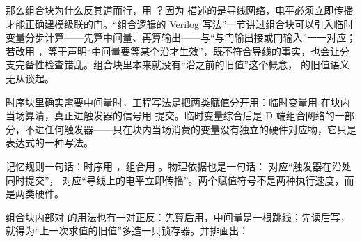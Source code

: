 那么组合块为什么反其道而行，用 \code{=}？因为  描述的是导线网络，电平必须立即传播才能正确建模级联的门。“组合逻辑的 Verilog 写法”一节讲过组合块可以引入临时变量分步计算——先算中间量、再算输出——与“与门输出接或门输入”一一对应；若改用 \code{<=}，等于声明“中间量要等某个沿才生效”，既不符合导线的事实，也会让分支完备性检查错乱。组合块里本来就没有“沿之前的旧值”这个概念，\code{<=} 的旧值语义无从谈起。

时序块里确实需要中间量时，工程写法是把两类赋值分开用：临时变量用 \code{=} 在块内当场算清，真正进触发器的信号用 \code{<=} 提交。临时变量综合后是 D 端组合网络的一部分，不进任何触发器——只在块内当场消费的变量没有独立的硬件对应物，它只是表达式的一种写法。

记忆规则一句话：时序用 \code{<=}，组合用 \code{=}。物理依据也是一句话：\code{<=} 对应“触发器在沿处同时提交”，\code{=} 对应“导线上的电平立即传播”。两个赋值符号不是两种执行速度，而是两类硬件。

组合块内部对 \code{=} 的用法也有一对正反：先算后用，中间量是一根跳线；先读后写，就得为“上一次求值的旧值”多造一只锁存器。并排画出：

